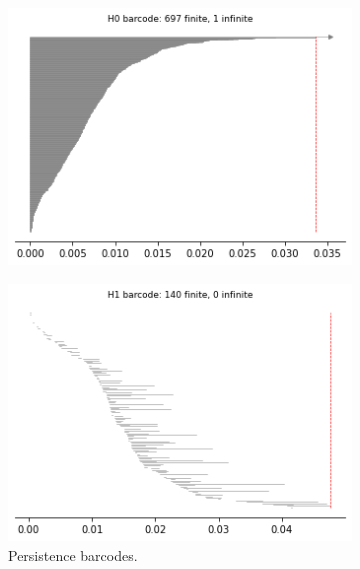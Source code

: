 \begin{figure}[H]
\begin{subfigure}[b]{0.25\textwidth}
\end{subfigure}
\begin{subfigure}[b]{0.24\textwidth}
    \includegraphics[width=\textwidth]{figures/topology/X4_H0_barcode.png}
    \caption{}
\end{subfigure}
\begin{subfigure}[b]{0.24\textwidth}
    \includegraphics[width=\textwidth]{figures/topology/X4_H1_barcode.png}
        \caption{Persistence barcodes.}
\end{subfigure}
\begin{subfigure}[b]{0.24\textwidth}

\end{subfigure}
\end{figure}

